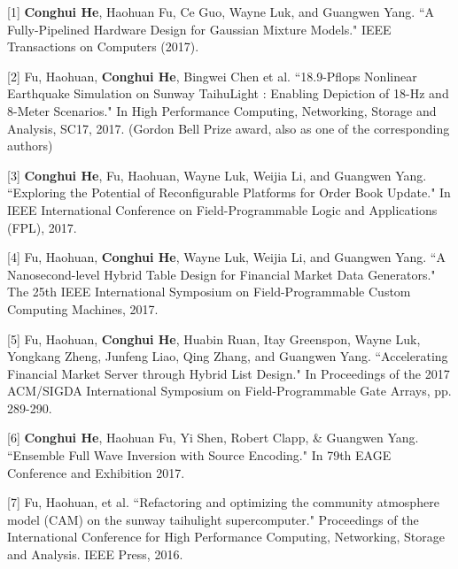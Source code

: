 \documentclass[11pt, a4paper]{awesome-cv}
\begin{document}


\begin{cvparagraph}

[1] \hspace{0.5mm} \textbf{Conghui He}, Haohuan Fu, Ce Guo, Wayne Luk, and Guangwen Yang. ``A Fully-Pipelined Hardware Design for Gaussian Mixture Models." IEEE Transactions on Computers (2017).

[2] \hspace{0.5mm} Fu, Haohuan, \textbf{Conghui He}, Bingwei Chen et al. ``18.9-Pflops Nonlinear Earthquake Simulation on Sunway TaihuLight : Enabling Depiction of 18-Hz and 8-Meter Scenarios." In High Performance Computing, Networking, Storage and Analysis, SC17, 2017. (Gordon Bell Prize award, also as one of the corresponding authors)

[3] \hspace{0.5mm} \textbf{Conghui He}, Fu, Haohuan, Wayne Luk, Weijia Li, and Guangwen Yang. ``Exploring the Potential of Reconfigurable Platforms for Order Book Update." In IEEE International Conference on Field-Programmable Logic and Applications (FPL), 2017.

[4] \hspace{0.5mm} Fu, Haohuan, \textbf{Conghui He}, Wayne Luk, Weijia Li, and Guangwen Yang. ``A Nanosecond-level Hybrid Table Design for Financial Market Data Generators." The 25th IEEE International Symposium on Field-Programmable Custom Computing Machines, 2017.

[5] \hspace{0.5mm} Fu, Haohuan, \textbf{Conghui He}, Huabin Ruan, Itay Greenspon, Wayne Luk, Yongkang Zheng, Junfeng Liao, Qing Zhang, and Guangwen Yang. ``Accelerating Financial Market Server through Hybrid List Design." In Proceedings of the 2017 ACM/SIGDA International Symposium on Field-Programmable Gate Arrays, pp. 289-290. 

[6] \hspace{0.5mm} \textbf{Conghui He}, Haohuan Fu, Yi Shen, Robert Clapp, \& Guangwen Yang. ``Ensemble Full Wave Inversion with Source Encoding." In 79th EAGE Conference and Exhibition 2017.

[7] \hspace{0.5mm} Fu, Haohuan, et al. ``Refactoring and optimizing the community atmosphere model (CAM) on the sunway taihulight supercomputer." Proceedings of the International Conference for High Performance Computing, Networking, Storage and Analysis. IEEE Press, 2016.


\end{cvparagraph}
\end{document}
